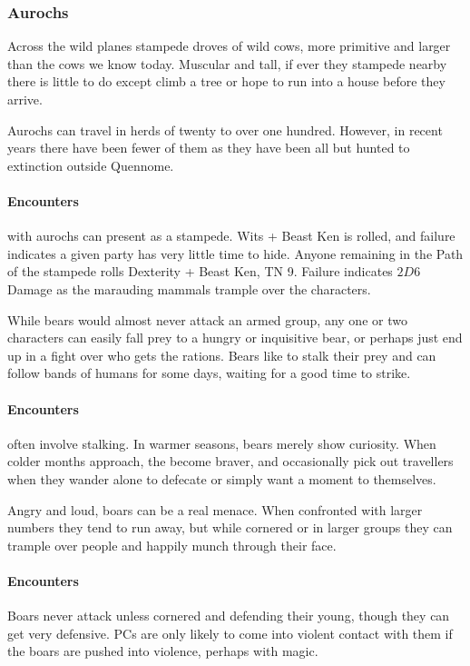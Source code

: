 \subsubsection{Aurochs}\label{auroch}

\auroch

Across the wild planes stampede droves of wild cows, more primitive and larger than the cows we know today.  Muscular and tall, if ever they stampede nearby there is little to do except climb a tree or hope to run into a house before they arrive.

	Aurochs can travel in herds of twenty to over one hundred.  However, in recent years there have been fewer of them as they have been all but hunted to extinction outside Quennome.

\paragraph{Encounters} with aurochs can present as a stampede.  Wits + Beast Ken is rolled, and failure indicates a given party has very little time to hide.  Anyone remaining in the Path of the stampede rolls Dexterity + Beast Ken, TN 9.  Failure indicates $2D6$ Damage as the marauding mammals trample over the characters.

\label{bear}

\bear

While bears would almost never attack an armed group, any one or two characters can easily fall prey to a hungry or inquisitive bear, or perhaps just end up in a fight over who gets the rations.  Bears like to stalk their prey and can follow bands of humans for some days, waiting for a good time to strike.

\paragraph{Encounters} often involve stalking.  In warmer seasons, bears merely show curiosity.  When colder months approach, the become braver, and occasionally pick out travellers when they wander alone to defecate or simply want a moment to themselves.

\label{boar}
\boar

Angry and loud, boars can be a real menace.  When confronted with larger numbers they tend to run away, but while cornered or in larger groups they can trample over people and happily munch through their face.

\paragraph{Encounters} Boars never attack unless cornered and defending their young, though they can get very defensive.  PCs are only likely to come into violent contact with them if the boars are pushed into violence, perhaps with magic.

